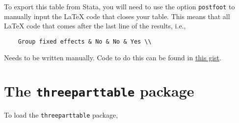 \documentclass[11pt,a4paper]{article}
\begin{document}
To export this table from Stata, you will need to use the option \texttt{postfoot} to manually input the {\LaTeX} code that closes your table. This means that all {\LaTeX} code that comes after the last line of the results, i.e.,
\begin{verbatim}
	Group fixed effects & No & No & Yes \\
\end{verbatim}
Needs to be written manually. Code to do this can be found in \href{https://gist.github.com/luizaandrade/568f18158b9f154f531da55d98653c77}{this gist}.

\section{The \texttt{threeparttable} package}

To load the \texttt{threeparttable} package, 

%

%	


%		

%		
\end{document}
